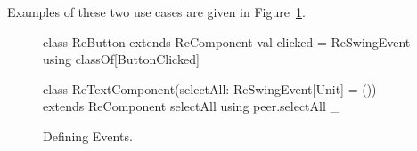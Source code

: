 \documentclass{scrartcl}
\begin{document}
Examples of these two use cases are given in
Figure~\ref{lst:defining-events}.

\begin{figure}[htp]
\begin{codenv}
class ReButton extends ReComponent {
  val clicked = ReSwingEvent using classOf[ButtonClicked]
}

class ReTextComponent(selectAll: ReSwingEvent[Unit] = ())
                            extends ReComponent {
  selectAll using peer.selectAll _
}
\end{codenv}
\caption{Defining Events.}
\label{lst:defining-events}
\end{figure}
\end{document}
